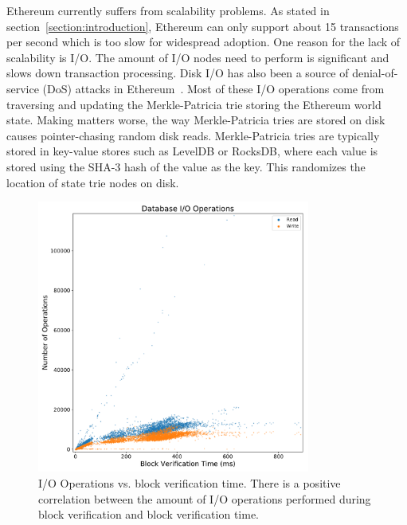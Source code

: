 \documentclass[12pt]{article}
\newcommand{\figurewidth}{0.8\textwidth}
\begin{document}

Ethereum currently suffers from scalability problems. As stated in section~\ref{section:introduction}, Ethereum can only support about 15 transactions per second which is too slow for widespread adoption. One reason for the lack of scalability is I/O. The amount of I/O nodes need to perform is significant and slows down transaction processing. Disk I/O has also been a source of denial-of-service (DoS) attacks in Ethereum~\cite{statelessclients}. Most of these I/O operations come from traversing and updating the Merkle-Patricia trie storing the Ethereum world state. Making matters worse, the way Merkle-Patricia tries are stored on disk causes pointer-chasing random disk reads. Merkle-Patricia tries are typically stored in key-value stores such as LevelDB or RocksDB, where each value is stored using the SHA-3 hash of the value as the key. This randomizes the location of state trie nodes on disk.

\begin{figure}[H]
  \centering
  \includegraphics[width=\figurewidth]{../figures/results/graphs/background/db-io-ops-elapsed.pdf}
  \caption{I/O Operations vs. block verification time. There is a positive correlation between the amount of I/O operations performed during block verification and block verification time.}
  \label{fig:blockverificationtime}
\end{figure}
\end{document}
